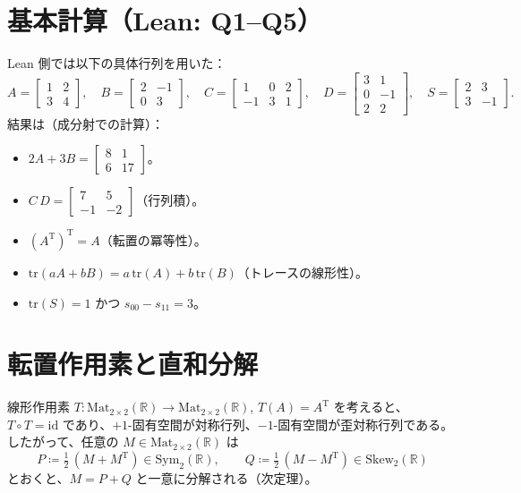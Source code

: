 \documentclass[luatexja,ja=standard,a4paper,12pt]{bxjsarticle}
\newcommand{\R}{\mathbb{R}}
\newcommand{\Mat}{\mathrm{Mat}}
\newcommand{\MatTwo}{\Mat_{2\times 2}(\R)}
\newcommand{\Sym}{\mathrm{Sym}_2(\R)}
\newcommand{\Skew}{\mathrm{Skew}_2(\R)}
\newcommand{\tr}{\mathrm{tr}}
\newcommand{\TT}{\mathrm{T}}
\theoremstyle{definition}
\theoremstyle{plain}
\theoremstyle{remark}
\begin{document}
\section{基本計算（Lean: Q1--Q5）}
Lean 側では以下の具体行列を用いた：
\[
  A=\begin{bmatrix}1&2\\[2pt]3&4\end{bmatrix},\quad
  B=\begin{bmatrix}2&-1\\[2pt]0&3\end{bmatrix},\quad
  C=\begin{bmatrix}1&0&2\\[2pt]-1&3&1\end{bmatrix},\quad
  D=\begin{bmatrix}3&1\\[2pt]0&-1\\[2pt]2&2\end{bmatrix},\quad
  S=\begin{bmatrix}2&3\\[2pt]3&-1\end{bmatrix}.
\]
結果は（成分射での計算）：
\begin{itemize}
  \item[Q1] $2A+3B=\begin{bmatrix}8&1\\[2pt]6&17\end{bmatrix}$。
  \item[Q2] $C\,D=\begin{bmatrix}7&5\\[2pt]-1&-2\end{bmatrix}$（行列積）。
  \item[Q3] $(A^{\TT})^{\TT}=A$（転置の冪等性）。
  \item[Q4] $\tr(aA+bB)=a\,\tr(A)+b\,\tr(B)$（トレースの線形性）。
  \item[Q5] $\tr(S)=1$ かつ $s_{00}-s_{11}=3$。
\end{itemize}

\section{転置作用素と直和分解}
線形作用素 $T:\MatTwo\to\MatTwo$, $T(A)=A^{\TT}$ を考えると、$T\circ T=\mathrm{id}$ であり、$+1$-固有空間が対称行列、$-1$-固有空間が歪対称行列である。したがって、任意の $M\in\MatTwo$ は
\[
  P\coloneqq \tfrac12\,(M+M^{\TT})\in\Sym,\qquad
  Q\coloneqq \tfrac12\,(M-M^{\TT})\in\Skew
\]
とおくと、$M=P+Q$ と一意に分解される（次定理）。
\end{document}
